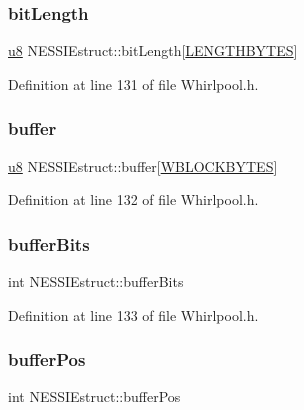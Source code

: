 \subsubsection{\texorpdfstring{bit\+Length}{bitLength}}
{\footnotesize\ttfamily \hyperlink{_whirlpool_8h_aed742c436da53c1080638ce6ef7d13de}{u8} N\+E\+S\+S\+I\+Estruct\+::bit\+Length\mbox{[}\hyperlink{_whirlpool_8h_a9dabcec09fcd1c75ae5c2e0bdb103f3f}{L\+E\+N\+G\+T\+H\+B\+Y\+T\+ES}\mbox{]}}



Definition at line 131 of file Whirlpool.\+h.

\mbox{\label{struct_n_e_s_s_i_estruct_ac52a1bce30ce731d8dc66b07986d9e04}} 
\subsubsection{\texorpdfstring{buffer}{buffer}}
{\footnotesize\ttfamily \hyperlink{_whirlpool_8h_aed742c436da53c1080638ce6ef7d13de}{u8} N\+E\+S\+S\+I\+Estruct\+::buffer\mbox{[}\hyperlink{_whirlpool_8h_afef17cf4c74a9ab0ed7cee5219394366}{W\+B\+L\+O\+C\+K\+B\+Y\+T\+ES}\mbox{]}}



Definition at line 132 of file Whirlpool.\+h.

\mbox{\label{struct_n_e_s_s_i_estruct_aa55f5f9b992b4d1937b88125171b3886}} 
\subsubsection{\texorpdfstring{buffer\+Bits}{bufferBits}}
{\footnotesize\ttfamily int N\+E\+S\+S\+I\+Estruct\+::buffer\+Bits}



Definition at line 133 of file Whirlpool.\+h.

\mbox{\label{struct_n_e_s_s_i_estruct_a9bf66bb21e68e6dce08efd3671ec0f13}} 
\subsubsection{\texorpdfstring{buffer\+Pos}{bufferPos}}
{\footnotesize\ttfamily int N\+E\+S\+S\+I\+Estruct\+::buffer\+Pos}



